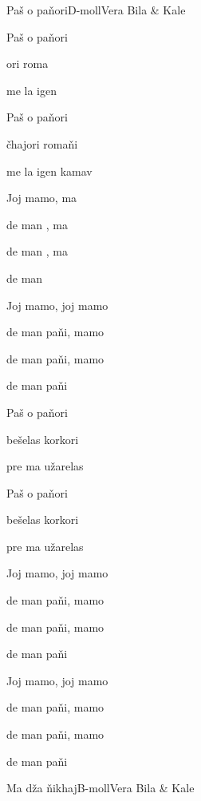 \documentclass[a4paper,draft]{book}
\begin{document}
\begin{otherlanguage}{czech}

\begin{song}{Paš o paňori}{D-moll}{}{Vera Bila \& Kale}{}{}

\begin{SBVerse}
	Paš o paňori
	
	ori roma
	
	me la igen 
	
	Paš o paňori
	
	čhajori romaňi
	
	me la igen kamav
\end{SBVerse}

\begin{SBChorus}
	Joj mamo,  ma
	
	de man , ma
	
	de man , ma
	
	de man 
	
	Joj mamo, joj mamo
	
	de man paňi, mamo
	
	de man paňi, mamo
	
	de man paňi
\end{SBChorus}

\begin{SBVerse}
	Paš o paňori
	
	bešelas korkori
	
	pre ma užarelas
	
	Paš o paňori
	
	bešelas korkori
	
	pre ma užarelas
\end{SBVerse}

\begin{SBChorus}
	Joj mamo, joj mamo
	
	de man paňi, mamo
	
	de man paňi, mamo
	
	de man paňi
	
	Joj mamo, joj mamo
	
	de man paňi, mamo
	
	de man paňi, mamo
	
	de man paňi
\end{SBChorus}

\end{song}

\begin{song}{Ma dža ňikhaj}{B-moll}{}{Vera Bila \& Kale}{}{}


\end{song}
\end{otherlanguage}
\end{document}
